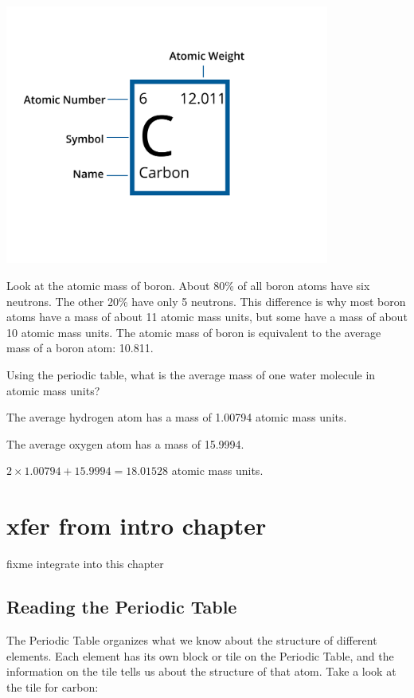 \includegraphics[width=0.8\textwidth]{element.png}

Look at the atomic mass of boron. About 80\% of all boron atoms have
six neutrons. The other 20\% have only 5 neutrons. This difference is why most boron atoms
have a mass of about 11 atomic mass units, but some have a mass of
about 10 atomic mass units. The atomic mass of boron is equivalent to the average
mass of a boron atom: 10.811.

\begin{Exercise}[title={Mass of a Water Molecule}, label=water_mass]

Using the periodic table, what is the average mass of one water molecule in atomic mass units?

\end{Exercise}
\begin{Answer}[ref=water_mass]

  The average hydrogen atom has a mass of 1.00794 atomic mass units.

  The average oxygen atom has a mass of 15.9994.

  $2 \times 1.00794 + 15.9994 = 18.01528$ atomic mass units.

\end{Answer}

\section{xfer from intro chapter} 
fixme integrate into this chapter
\subsection{Reading the Periodic Table}
The Periodic Table organizes what we know about the structure of different
elements. Each element has its own block or tile on the Periodic Table, and the
information on the tile tells us about the structure of that atom. Take a look at
the tile for carbon:

